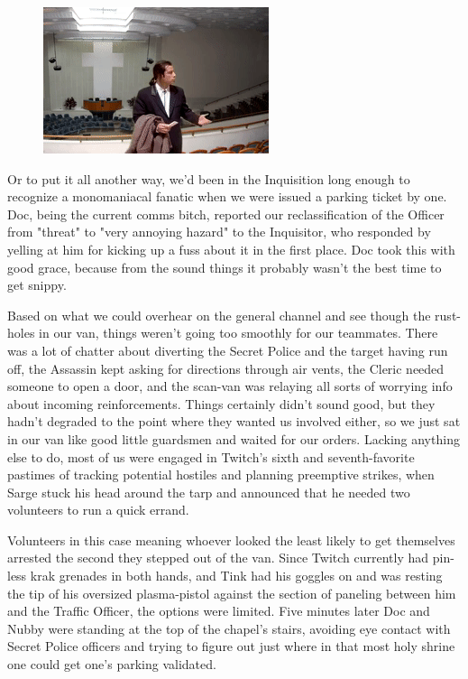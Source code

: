 \begin{figure}
	\begin{center}
		\includegraphics[width=\figwidth]{pics/17/45.png}
	\end{center}
\end{figure}
Or to put it all another way, we'd been in the Inquisition long enough to recognize a monomaniacal fanatic when we were issued a parking ticket by one. 
Doc, being the current comms bitch, reported our reclassification of the Officer from "threat" to "very annoying hazard" to the Inquisitor, who responded by yelling at him for kicking up a fuss about it in the first place. 
Doc took this with good grace, because from the sound things it probably wasn't the best time to get snippy.

Based on what we could overhear on the general channel and see though the rust-holes in our van, things weren't going too smoothly for our teammates. 
There was a lot of chatter about diverting the Secret Police and the target having run off, the Assassin kept asking for directions through air vents, the Cleric needed someone to open a door, and the scan-van was relaying all sorts of worrying info about incoming reinforcements. 
Things certainly didn't sound good, but they hadn't degraded to the point where they wanted us involved either, so we just sat in our van like good little guardsmen and waited for our orders. 
Lacking anything else to do, most of us were engaged in Twitch's sixth and seventh-favorite pastimes of tracking potential hostiles and planning preemptive strikes, when Sarge stuck his head around the tarp and announced that he needed two volunteers to run a quick errand.

Volunteers in this case meaning whoever looked the least likely to get themselves arrested the second they stepped out of the van. 
Since Twitch currently had pin-less krak grenades in both hands, and Tink had his goggles on and was resting the tip of his oversized plasma-pistol against the section of paneling between him and the Traffic Officer, the options were limited. 
Five minutes later Doc and Nubby were standing at the top of the chapel's stairs, avoiding eye contact with Secret Police officers and trying to figure out just where in that most holy shrine one could get one's parking validated.

